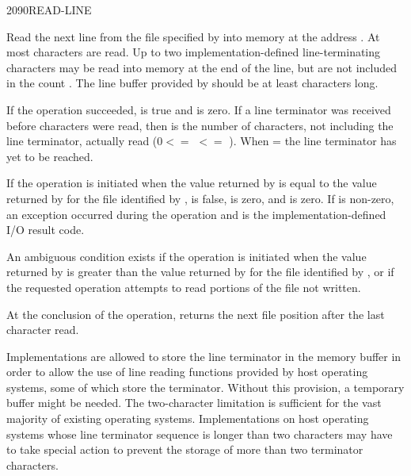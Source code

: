 \begin{worddef}{2090}{READ-LINE}
\item {}

	Read the next line from the file specified by  into
	memory at the address . At most  characters
	are read. Up to two implementation-defined line-terminating
	characters may be read into memory at the end of the line, but
	are not included in the count . The line buffer provided
	by  should be at least  characters long.

	If the operation succeeded,  is true and 
	is zero. If a line terminator was received before 
	characters were read, then  is the number of characters,
	not including the line terminator, actually read ($0 <=$ 
	$<=$ ). When  =  the line
	terminator has yet to be reached.

	If the operation is initiated when the value returned by
	 is equal to the value returned by
	 for the file identified by ,
	 is false,  is zero, and  is zero.
	If  is non-zero, an exception occurred during the
	operation and  is the implementation-defined I/O
	result code.

	An ambiguous condition exists if the operation is initiated when
	the value returned by  is greater than the
	value returned by  for the file identified by
	, or if the requested operation attempts to read
	portions of the file not written.

	At the conclusion of the operation,  returns
	the next file position after the last character read.

\see {}

	\begin{rationale} %
		Implementations are allowed to store the line terminator in
		the memory buffer in order to allow the use of line reading
		functions provided by host operating systems, some of which
		store the terminator. Without this provision, a temporary
		buffer might be needed. The two-character limitation is
		sufficient for the vast majority of existing operating
		systems. Implementations on host operating systems whose line
		terminator sequence is longer than two characters may have to
		take special action to prevent the storage of more than two
		terminator characters.


\end{rationale}
\end{worddef}
